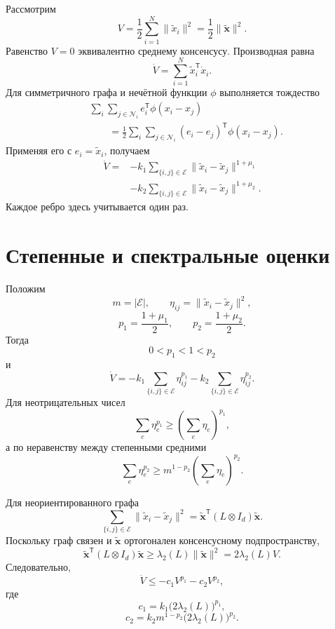 Рассмотрим
\[
    V
    =
    \frac12
    \sum_{i=1}^{N}\lVert\widetilde x_i\rVert^2
    =
    \frac12\lVert\widetilde{\mathbf x}\rVert^2.
\]
Равенство \(V=0\) эквивалентно среднему консенсусу. Производная
равна
\[
    \dot V
    =
    \sum_{i=1}^{N}
    \widetilde x_i^{\mathsf T}\dot x_i.
\]
Для симметричного графа и нечётной функции \(\phi\) выполняется
тождество
\[
\begin{aligned}
    &\sum_i\sum_{j\in\mathcal N_i}
    e_i^{\mathsf T}\phi(x_i-x_j)
    \\
    &\qquad=
    \frac12
    \sum_i\sum_{j\in\mathcal N_i}
    (e_i-e_j)^{\mathsf T}\phi(x_i-x_j).
\end{aligned}
\]
Применяя его с \(e_i=\widetilde x_i\), получаем
\[
\begin{aligned}
    \dot V
    ={}&
    -k_1
    \sum_{\{i,j\}\in\mathcal E}
    \lVert\widetilde x_i-
            \widetilde x_j\rVert^{1+\mu_1}
    \\
    &-
    k_2
    \sum_{\{i,j\}\in\mathcal E}
    \lVert\widetilde x_i-
            \widetilde x_j\rVert^{1+\mu_2}.
\end{aligned}
\]
Каждое ребро здесь учитывается один раз.

\section{Степенные и спектральные оценки}

Положим
\[
    m=|\mathcal E|,
    \qquad
    \eta_{ij}
    =
    \lVert\widetilde x_i-
            \widetilde x_j\rVert^2,
\]
\[
    p_1=\frac{1+\mu_1}{2},
    \qquad
    p_2=\frac{1+\mu_2}{2}.
\]
Тогда
\[
    0<p_1<1<p_2
\]
и
\[
    \dot V
    =
    -k_1\sum_{\{i,j\}\in\mathcal E}\eta_{ij}^{p_1}
    -k_2\sum_{\{i,j\}\in\mathcal E}\eta_{ij}^{p_2}.
\]
Для неотрицательных чисел
\[
    \sum_e\eta_e^{p_1}
    \ge
    \left(\sum_e\eta_e\right)^{p_1},
\]
а по неравенству между степенными средними
\[
    \sum_e\eta_e^{p_2}
    \ge
    m^{1-p_2}
    \left(\sum_e\eta_e\right)^{p_2}.
\]

Для неориентированного графа
\[
    \sum_{\{i,j\}\in\mathcal E}
    \lVert\widetilde x_i-
            \widetilde x_j\rVert^2
    =
    \widetilde{\mathbf x}^{\mathsf T}
    (L\otimes I_d)
    \widetilde{\mathbf x}.
\]
Поскольку граф связен и
\(\widetilde{\mathbf x}\) ортогонален консенсусному подпространству,
\[
    \widetilde{\mathbf x}^{\mathsf T}
    (L\otimes I_d)
    \widetilde{\mathbf x}
    \ge
    \lambda_2(L)
    \lVert\widetilde{\mathbf x}\rVert^2
    =
    2\lambda_2(L)V.
\]
Следовательно,
\[
    \dot V
    \le
    -c_1V^{p_1}
    -c_2V^{p_2},
\]
где
\[
    c_1
    =
    k_1\bigl(2\lambda_2(L)\bigr)^{p_1},
\]
\[
    c_2
    =
    k_2m^{1-p_2}
    \bigl(2\lambda_2(L)\bigr)^{p_2}.
\]


